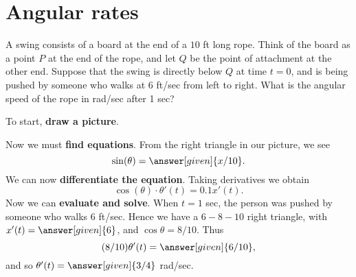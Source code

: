 \documentclass{ximera}
\begin{document}
\section{Angular rates}

\begin{example}
A swing consists of a board at the end of a $10$ ft long rope.  Think
of the board as a point $P$ at the end of the rope, and let $Q$ be the
point of attachment at the other end.  Suppose that the swing is
directly below $Q$ at time $t=0$, and is being pushed by someone who
walks at 6 ft/sec from left to right.  What is the angular speed of
the rope in rad/sec after 1 sec?


\begin{explanation}
To start, \textbf{draw a picture}.
\begin{image}
\end{image}
Now we must \textbf{find equations}. From the right triangle in our
picture, we see
\[
\sin(\theta)=\answer[given]{x/10}.
\]
We can now \textbf{differentiate the equation}. Taking derivatives we obtain 
\[
\cos(\theta)\cdot \theta'(t)=0.1 x'(t).
\]
Now we can \textbf{evaluate and solve}.  When $t=1$ sec, the person
was pushed by someone who walks $6$ ft/sec. Hence we have a $6-8-10$
right triangle, with $x'(t) = \answer[given]{6}$, and
$\cos\theta=8/10$. Thus
\[
(8/10) \theta'(t) =\answer[given]{6/10},
\]
and so  $\theta'(t)=\answer[given]{3/4}$ rad/sec.
\end{explanation} 
\end{example}
\end{document}
